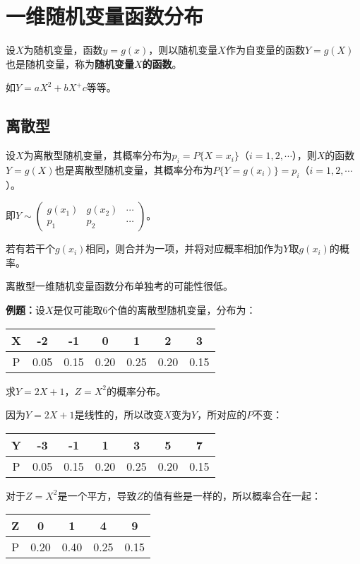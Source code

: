 \section{一维随机变量函数分布}

设$X$为随机变量，函数$y=g(x)$，则以随机变量$X$作为自变量的函数$Y=g(X)$也是随机变量，称为\textbf{随机变量$X$的函数}。

如$Y=aX^2+bX^+c$等等。

\subsection{离散型}

设$X$为离散型随机变量，其概率分布为$p_i=P\{X=x_i\}$（$i=1,2,\cdots$），则$X$的函数$Y=g(X)$也是离散型随机变量，其概率分布为$P\{Y=g(x_i)\}=p_i$（$i=1,2,\cdots$）。

即$Y\sim\left(\begin{array}{ccc}
    g(x_1) & g(x_2) & \cdots \\
    p_1 & p_2 & \cdots
\end{array}\right)$。

若有若干个$g(x_i)$相同，则合并为一项，并将对应概率相加作为$Y$取$g(x_i)$的概率。

离散型一维随机变量函数分布单独考的可能性很低。

\textbf{例题：}设$X$是仅可能取6个值的离散型随机变量，分布为：\medskip

\begin{tabular}{c|cccccc}
    \hline
    X & -2 & -1 & 0 & 1 & 2 & 3 \\ \hline
    P & 0.05 & 0.15 & 0.20 & 0.25 & 0.20 & 0.15 \\
    \hline
\end{tabular} \medskip

求$Y=2X+1$，$Z=X^2$的概率分布。

因为$Y=2X+1$是线性的，所以改变$X$变为$Y$，所对应的$P$不变：\medskip

\begin{tabular}{c|cccccc}
    \hline
    Y & -3 & -1 & 1 & 3 & 5 & 7 \\ \hline
    P & 0.05 & 0.15 & 0.20 & 0.25 & 0.20 & 0.15 \\
    \hline
\end{tabular} \medskip

对于$Z=X^2$是一个平方，导致$Z$的值有些是一样的，所以概率合在一起：\medskip

\begin{tabular}{c|cccc}
    \hline
    Z & 0 & 1 & 4 & 9 \\ \hline
    P & 0.20 & 0.40 & 0.25 & 0.15 \\
    \hline
\end{tabular}

